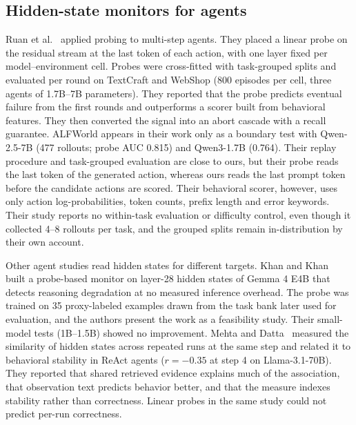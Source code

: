 \documentclass[11pt]{article}
\begin{document}
\subsection{Hidden-state monitors for agents}
Ruan et al.~\cite{ruan2026doomed} applied probing to multi-step agents. They placed a linear probe on the residual stream at the last token of each action, with one layer fixed per model--environment cell.
Probes were cross-fitted with task-grouped splits and evaluated per round on TextCraft and WebShop (800 episodes per cell, three agents of 1.7B--7B parameters).
They reported that the probe predicts eventual failure from the first rounds and outperforms a scorer built from behavioral features. They then converted the signal into an abort cascade with a recall guarantee.
ALFWorld appears in their work only as a boundary test with Qwen-2.5-7B (477 rollouts; probe AUC 0.815) and Qwen3-1.7B (0.764). Their replay procedure and task-grouped evaluation are close to ours, but their probe reads the last token of the generated action, whereas ours reads the last prompt token before the candidate actions are scored.
Their behavioral scorer, however, uses only action log-probabilities, token counts, prefix length and error keywords. Their study reports no within-task evaluation or difficulty control, even though it collected 4--8 rollouts per task, and the grouped splits remain in-distribution by their own account.

Other agent studies read hidden states for different targets. Khan and Khan~\cite{khan2026companion} built a probe-based monitor on layer-28 hidden states of Gemma 4 E4B that detects reasoning degradation at no measured inference overhead.
The probe was trained on 35 proxy-labeled examples drawn from the task bank later used for evaluation, and the authors present the work as a feasibility study. Their small-model tests (1B--1.5B) showed no improvement.
Mehta and Datta~\cite{mehta2026commit} measured the similarity of hidden states across repeated runs at the same step and related it to behavioral stability in ReAct agents ($r=-0.35$ at step 4 on Llama-3.1-70B).
They reported that shared retrieved evidence explains much of the association, that observation text predicts behavior better, and that the measure indexes stability rather than correctness. Linear probes in the same study could not predict per-run correctness.
\end{document}
